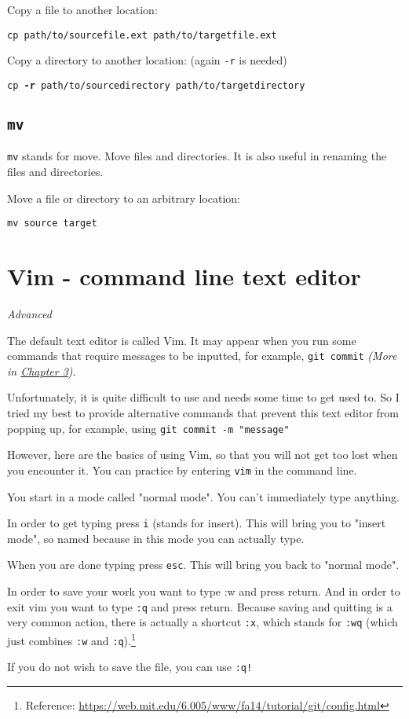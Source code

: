 Copy a file to another location:

\texttt{cp path/to/source\textunderscore file.ext path/to/target\textunderscore file.ext}
\vspace{6mm}

Copy a directory to another location: (again \texttt{-r} is needed)

\texttt{cp \textbf{-r} path/to/source\textunderscore directory path/to/target\textunderscore directory}

\subsection{\texttt{mv}}

\texttt{mv} stands for move. Move files and directories. It is also useful in renaming the files and directories.
\vspace{6mm}

Move a file or directory to an arbitrary location:

\texttt{mv source target}

\section{Vim - command line text editor}
\label{sec:vim}

\textit{Advanced}
\vspace{6mm}

The default text editor is called Vim. It may appear when you run some commands that require messages to be inputted, for example, \texttt{git commit} \textit{(More in \hyperref[sec:gcmsg]{Chapter 3})}.

Unfortunately, it is quite difficult to use and needs some time to get used to. So I tried my best to provide alternative commands that prevent this text editor from popping up, for example, using \texttt{git commit -m "message"}

However, here are the basics of using Vim, so that you will not get too lost when you encounter it. You can practice by entering \texttt{vim} in the command line.

You start in a mode called "normal mode". You can’t immediately type anything.

In order to get typing press \texttt{i} (stands for insert). This will bring you to "insert mode", so named because in this mode you can actually type.

When you are done typing press \texttt{esc}. This will bring you back to "normal mode".

In order to save your work you want to type :w and press return. And in order to exit vim you want to type \texttt{:q} and press return. Because saving and quitting is a very common action, there is actually a shortcut \texttt{:x}, which stands for \texttt{:wq} (which just combines \texttt{:w} and \texttt{:q}).\footnote{Reference: \url{https://web.mit.edu/6.005/www/fa14/tutorial/git/config.html}}


If you do not wish to save the file, you can use \texttt{:q!}


